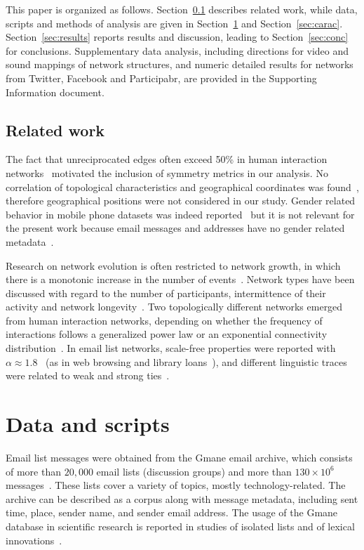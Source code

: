 \documentclass[%
aip,
jmp,%
amsmath,amssymb,
reprint,%
]{revtex4-1}
\begin{document}
This paper is organized as follows. Section~\ref{sec:related} describes related work, while data, scripts and methods of analysis are given in Section~\ref{sec:data} and Section~\ref{sec:carac}.
Section~\ref{sec:results} reports results and discussion, leading to Section~\ref{sec:conc} for conclusions.
Supplementary data analysis, including directions for video and sound mappings of network structures, and numeric detailed results for networks from Twitter, Facebook and Participabr, are provided in the Supporting Information document.


\subsection{Related work}\label{sec:related}
The fact that unreciprocated edges often exceed 50\% in human interaction networks~\cite{newmanEvolving} motivated the inclusion of symmetry metrics in our analysis.
No correlation of topological characteristics and geographical coordinates was found~\cite{barabasiGeo},
therefore geographical positions were not considered in our study.
Gender related behavior in mobile phone datasets was indeed reported~\cite{barabasiSex}
but it is not relevant for the present work because email messages and addresses have no gender related metadata~\cite{gmanePack}.

Research on network evolution is often restricted to network growth, in which there is a monotonic increase in the number of events~\cite{barabasiEvo}.
Network types have been discussed with regard to the number of participants, intermittence of their activity and network longevity~\cite{barabasiEvo}. Two topologically different networks emerged from human interaction networks, depending on whether the frequency of interactions follows a generalized power law or an exponential connectivity distribution~\cite{barabasiTopologicalEv}. In email list networks, scale-free properties were reported with $\alpha \approx 1.8$~\cite{bird} (as in web browsing and library loans~\cite{barabasiHumanDyn}), and different linguistic traces were related to weak and strong ties~\cite{Gmane2}.

\section{Data and scripts}\label{sec:data}\label{scripts}

Email list messages were obtained from
the Gmane email archive, which consists of more than $20,000$
email lists (discussion groups) and more than $130\times 10^6$ messages~\cite{Gmanewikipedia}. These lists cover a variety of topics, mostly technology-related. The archive can be described as a corpus along with message metadata, including sent time, place, sender name, and sender email address.
The usage of the Gmane database in scientific research is reported in studies of isolated lists and of lexical innovations~\cite{Gmane2,bird}. 
\end{document}
